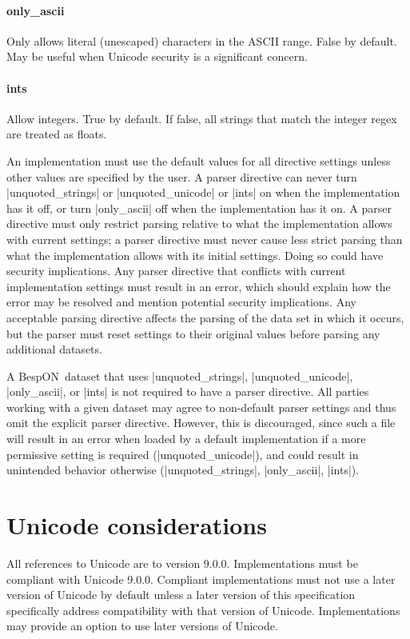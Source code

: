 \documentclass[11pt]{article}
\newcommand{\bespon}{BespON}
\begin{document}
{{\paragraph{only\_ascii}  Only allows literal (unescaped) characters in the ASCII range.  False by default.  May be useful when Unicode security is a significant concern.

\paragraph{ints}  Allow integers.  True by default.  If false, all strings that match the integer regex are treated as floats.

An implementation must use the default values for all directive settings unless other values are specified by the user.  A parser directive can never turn |unquoted_strings| or |unquoted_unicode| or |ints| on when the implementation has it off, or turn |only_ascii| off when the implementation has it on.  A parser directive must only restrict parsing relative to what the implementation allows with current settings; a parser directive must never cause less strict parsing than what the implementation allows with its initial settings.  Doing so could have security implications.  Any parser directive that conflicts with current implementation settings must result in an error, which should explain how the error may be resolved and mention potential security implications.  Any acceptable parsing directive affects the parsing of the data set in which it occurs, but the parser must reset settings to their original values before parsing any additional datasets.

A \bespon\ dataset that uses |unquoted_strings|, |unquoted_unicode|, |only_ascii|, or |ints| is not required to have a parser directive.  All parties working with a given dataset may agree to non-default parser settings and thus omit the explicit parser directive.  However, this is discouraged, since such a file will result in an error when loaded by a default implementation if a more permissive setting is required (|unquoted_unicode|), and could result in unintended behavior otherwise (|unquoted_strings|, |only_ascii|, |ints|).


\section{Unicode considerations}

All references to Unicode are to version 9.0.0.  Implementations must be compliant with Unicode 9.0.0.  Compliant implementations must not use a later version of Unicode by default unless a later version of this specification specifically address compatibility with that version of Unicode.  Implementations may provide an option to use later versions of Unicode.



}}
\end{document}
